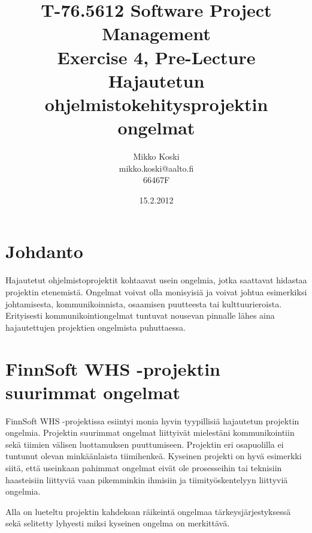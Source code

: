 \documentclass[a4paper]{article}
\begin{document}
\title{\small T-76.5612 Software Project Management \\ Exercise 4, Pre-Lecture \\ \huge Hajautetun ohjelmistokehitysprojektin ongelmat}
\date{15.2.2012}
\author{Mikko Koski \\ mikko.koski@aalto.fi \\ 66467F}
\maketitle

\normalsize

\section{Johdanto}

Hajautetut ohjelmistoprojektit kohtaavat usein ongelmia, jotka saattavat hidastaa projektin etenemistä. Ongelmat voivat olla monisyisiä ja voivat johtua esimerkiksi johtamisesta, kommunikoinnista, osaamisen puutteesta tai kulttuurieroista. Erityisesti kommunikointiongelmat tuntuvat nousevan pinnalle lähes aina hajautettujen projektien ongelmista puhuttaessa.

\section{FinnSoft WHS -projektin suurimmat ongelmat}

FinnSoft WHS -projektissa esiintyi monia hyvin tyypillisiä hajautetun projektin ongelmia. Projektin suurimmat ongelmat liittyivät mielestäni kommunikointiin sekä tiimien välisen luottamuksen puuttumiseen. Projektin eri osapuolilla ei tuntunut olevan minkäänlaista tiimihenkeä. Kyseinen projekti on hyvä esimerkki siitä, että useinkaan pahimmat ongelmat eivät ole prosesseihin tai teknisiin haasteisiin liittyviä vaan pikemminkin ihmisiin ja tiimityöskentelyyn liittyviä ongelmia.

Alla on lueteltu projektin kahdeksan räikeintä ongelmaa tärkeysjärjestyksessä sekä selitetty lyhyesti miksi kyseinen ongelma on merkittävä.

\end{document}
